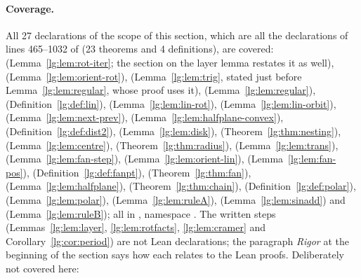 \paragraph{Coverage.}
All 27 declarations of the scope of this section, which are all the declarations of lines 465--1032 of
 (23 theorems and 4 definitions), are covered:
 (Lemma~\ref{lg:lem:rot-iter}; the section on the layer lemma restates it as well),
 (Lemma~\ref{lg:lem:orient-rot}),
 (Lemma~\ref{lg:lem:trig}, stated just before Lemma~\ref{lg:lem:regular}, whose proof uses it),
 (Lemma~\ref{lg:lem:regular}),
 (Definition~\ref{lg:def:lin}),
 (Lemma~\ref{lg:lem:lin-rot}),
 (Lemma~\ref{lg:lem:lin-orbit}),
 (Lemma~\ref{lg:lem:next-prev}),
 (Lemma~\ref{lg:lem:halfplane-convex}),
 (Definition~\ref{lg:def:dist2}),
 (Lemma~\ref{lg:lem:disk}),
 (Theorem~\ref{lg:thm:nesting}),
 (Lemma~\ref{lg:lem:centre}),
 (Theorem~\ref{lg:thm:radius}),
 (Lemma~\ref{lg:lem:trans}),
 (Lemma~\ref{lg:lem:fan-step}),
 (Lemma~\ref{lg:lem:orient-lin}),
 (Lemma~\ref{lg:lem:fan-pos}),
 (Definition~\ref{lg:def:fanpt}),
 (Theorem~\ref{lg:thm:fan}),
 (Lemma~\ref{lg:lem:halfplane}),
 (Theorem~\ref{lg:thm:chain}),
 (Definition~\ref{lg:def:polar}),
 (Lemma~\ref{lg:lem:polar}),
 (Lemma~\ref{lg:lem:ruleA}),
 (Lemma~\ref{lg:lem:sinadd}) and
 (Lemma~\ref{lg:lem:ruleB}); all in , namespace
.
The written steps (Lemmas~\ref{lg:lem:layer}, \ref{lg:lem:rotfacts}, \ref{lg:lem:cramer} and
Corollary~\ref{lg:cor:period}) are not Lean declarations; the paragraph \emph{Rigor} at the beginning of the section
says how each relates to the Lean proofs.
Deliberately not covered here:

